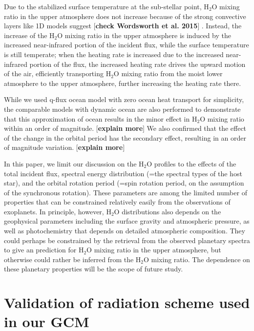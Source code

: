 \documentclass[11pt,numberedappendix,twocolappendix,]{emulateapj}
\def\water{H$_2$O }
\def\memo#1{\color{red}$[${\bf #1}$]$ \color{black}}
\begin{document}
Due to the stabilized surface temperature at the sub-stellar point, \water mixing ratio in the upper atmosphere does not increase because of the strong convective layers like 1D models suggest \memo{check Wordsworth et al. 2015}. 
Instead, the increase of the \water mixing ratio in the upper atmosphere is induced by the increased near-infrared portion of the incident flux, while the surface temperature is still temperate; when the heating rate is increased due to the increased near-infrared portion of the flux, the increased heating rate drives the upward motion of the air, efficiently transporting \water mixing ratio from the moist lower atmosphere to the upper atmosphere, further increasing the heating rate there. 

While we used q-flux ocean model with zero ocean heat transport for simplicity, the comparable models with dynamic ocean are also performed to demonstrate that this approximation of ocean results in the minor effect in \water mixing ratio within an order of magnitude. 
\memo{explain more}
We also confirmed that the effect of the change in the orbital period has the secondary effect, resulting in an order of magnitude variation. 
\memo{explain more}

In this paper, we limit our discussion on the \water profiles to the effects of the total incident flux, spectral energy distribution (=the spectral types of the host star), and the orbital rotation period (=spin rotation period, on the assumption of the synchronous rotation). 
These parameters are among the limited number of properties that can be constrained relatively easily from the observations of exoplanets. 
In principle, however, \water distributions also depends on the geophysical parameters including the surface gravity and atmospheric pressure, as well as photochemistry that depends on detailed atmospheric composition. 
They could perhaps be constrained by the retrieval from the observed planetary spectra to give an prediction for \water mixing ratio in the upper atmosphere, but  otherwise could rather be inferred from the \water mixing ratio. 
The dependence on these planetary properties will be the scope of future study. 





\acknowledgments




\appendix


\section{Validation of radiation scheme used in our GCM}
\label{ap:radiation}
\end{document}
